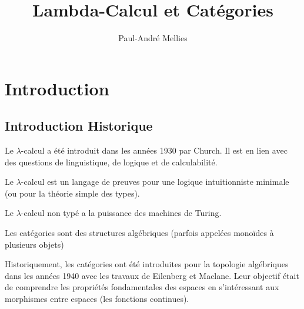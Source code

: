 \documentclass[math]{cours}
\title{Lambda-Calcul et Catégories}
\author{Paul-André Mellies}
\begin{document}
\bettertitle

\section{Introduction}
\subsection{Introduction Historique}
Le $\lambda$-calcul a été introduit dans les années 1930 par Church.
Il est en lien avec des questions de linguistique, de logique et de calculabilité.
\begin{definition}
	Le $\lambda$-calcul est un langage de preuves pour une logique intuitionniste minimale (ou pour la théorie simple des types).
	\label{def:lambdacalcul}
\end{definition}
Le $\lambda$-calcul non typé a la puissance des machines de Turing.

\begin{definition}
	Les catégories sont des structures algébriques (parfois appelées monoïdes à plusieurs objets)
	\label{def:categoryyyyyyyy}
\end{definition}
Historiquement, les catégories ont été introduites pour la topologie algébriques dans les années 1940 avec les travaux de Eilenberg et Maclane.
Leur objectif était de comprendre les propriétés fondamentales des espaces en s'intéressant aux morphismes entre espaces (les fonctions continues).
\end{document}
